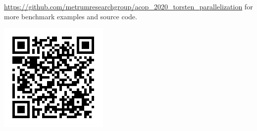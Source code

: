 \documentclass[landscape,a0paper,fontscale=0.45]{baposter} %
\newcommand{\compresslist}{ %
\setlength{\itemsep}{1pt}
\setlength{\parskip}{0pt}
\setlength{\parsep}{0pt}
}
\begin{document}
\begin{poster}
 {
\begin{multicols}{2}
\url{https://github.com/metrumresearchgroup/acop_2020_torsten_parallelization}
for more benchmark examples and source code.
\begin{flushright}
\includegraphics[width=0.4\linewidth]{./figure/github_repo_qr_code.png}
\end{flushright}
\end{multicols}  
}








\end{poster}
\end{document}
